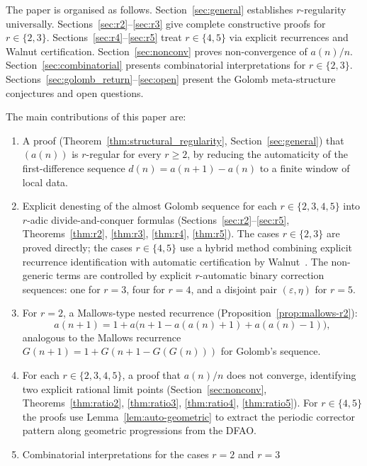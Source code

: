 \documentclass[12pt]{article}
\theoremstyle{definition}
\theoremstyle{remark}
\begin{document}
The paper is organised as follows.
Section~\ref{sec:general} establishes $r$-regularity universally.
Sections~\ref{sec:r2}--\ref{sec:r3} give complete constructive proofs
for $r\in\{2,3\}$.
Sections~\ref{sec:r4}--\ref{sec:r5} treat $r\in\{4,5\}$ via explicit
recurrences and Walnut certification.
Section~\ref{sec:nonconv} proves non-convergence of $a(n)/n$.
Section~\ref{sec:combinatorial} presents combinatorial interpretations
for $r\in\{2,3\}$.
Sections~\ref{sec:golomb_return}--\ref{sec:open} present the Golomb
meta-structure conjectures and open questions.

The main contributions of this paper are:
\begin{enumerate}
  \item A proof (Theorem~\ref{thm:structural_regularity}, Section~\ref{sec:general}) that $(a(n))$ is $r$-regular
        for every $r\ge 2$, by reducing the automaticity of the first-difference
        sequence $d(n)=a(n+1)-a(n)$ to a finite window of local data.
  \item Explicit denesting of the almost Golomb sequence for each
        $r\in\{2,3,4,5\}$ into $r$-adic divide-and-conquer formulas
        (Sections~\ref{sec:r2}--\ref{sec:r5}, Theorems~\ref{thm:r2}, \ref{thm:r3}, \ref{thm:r4}, \ref{thm:r5}).
        The cases $r\in\{2,3\}$ are proved directly; the cases $r\in\{4,5\}$
        use a hybrid method combining explicit recurrence identification
        with automatic certification by Walnut~\cite{Shallit2022}.
        The non-generic terms are controlled by explicit $r$-automatic
        binary correction sequences: one for $r=3$, four
        for $r=4$, and a disjoint pair $(\varepsilon,\eta)$ for $r=5$.
  \item For $r=2$, a Mallows-type nested recurrence
        (Proposition~\ref{prop:mallows-r2}):
        \[
          a(n+1)=1+a\bigl(n+1-a(a(n)+1)+a(a(n)-1)\bigr),
        \]
        analogous to the Mallows recurrence $G(n+1)=1+G(n+1-G(G(n)))$
        for Golomb's sequence.
  \item For each $r\in\{2,3,4,5\}$, a proof that $a(n)/n$ does not converge,
        identifying two explicit rational limit points
        (Section~\ref{sec:nonconv}, Theorems~\ref{thm:ratio2}, \ref{thm:ratio3},
        \ref{thm:ratio4}, \ref{thm:ratio5}).
        For $r\in\{4,5\}$ the proofs use
        Lemma~\ref{lem:auto-geometric} to extract the periodic
        corrector pattern along geometric progressions from the DFAO.
  \item Combinatorial interpretations for the cases $r=2$ and $r=3$

\end{enumerate}
\end{document}
